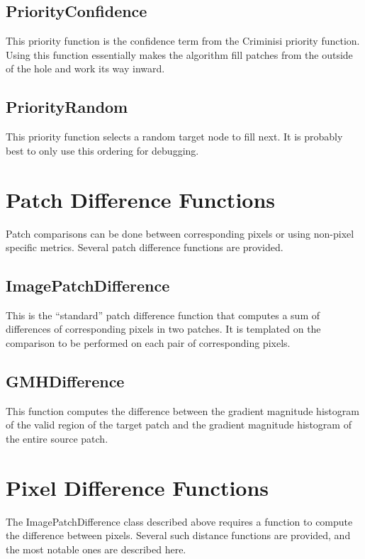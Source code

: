 \documentclass{InsightArticle}
\begin{document}
\subsection{PriorityConfidence}
This priority function is the confidence term from the Criminisi priority function. Using this function essentially makes the algorithm fill patches from the outside of the hole and work its way inward.

\subsection{PriorityRandom}
This priority function selects a random target node to fill next. It is probably best to only use this ordering for debugging.

\section{Patch Difference Functions}
\label{sec:PatchMatching}
Patch comparisons can be done between corresponding pixels or using non-pixel specific metrics. Several patch difference functions are provided.

\subsection{ImagePatchDifference}
This is the ``standard'' patch difference function that computes a sum of differences of corresponding pixels in two patches. It is templated on the comparison to be performed on each pair of corresponding pixels.

\subsection{GMHDifference}
This function computes the difference between the gradient magnitude histogram of the valid region of the target patch and the gradient magnitude histogram of the entire source patch. 

\section{Pixel Difference Functions}
\label{sec:PatchMatching}
The ImagePatchDifference class described above requires a function to compute the difference between pixels. Several such distance functions are provided, and the most notable ones are described here.
\end{document}

